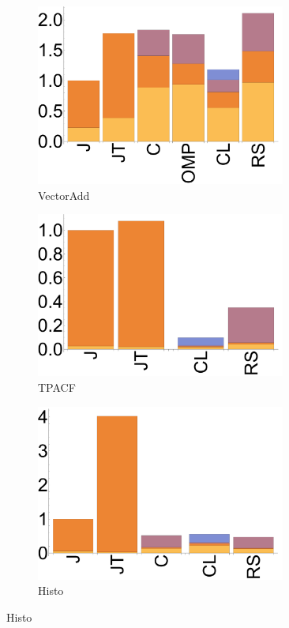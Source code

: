 \begin{figure}[ht]
  \begin{subfigure}[b]{0.3\textwidth}
      \includegraphics[width=0.9\textwidth]{data/bbattery_vectoradd_nexus5.pdf}
      \caption{VectorAdd}\label{fig:vectoradd}
  \end{subfigure}

  \begin{subfigure}[b]{0.3\textwidth}
      \includegraphics[width=0.9\textwidth]{data/bbattery_tpacf_nexus5.pdf}
      \caption{TPACF} \label{fig:TPACF}
  \end{subfigure}

  \begin{subfigure}[b]{0.3\textwidth}
      \includegraphics[width=0.9\textwidth]{data/bbattery_histogram_nexus5.pdf}
      \caption{Histo}\label{fig:histo}
  \end{subfigure}


\end{figure}
